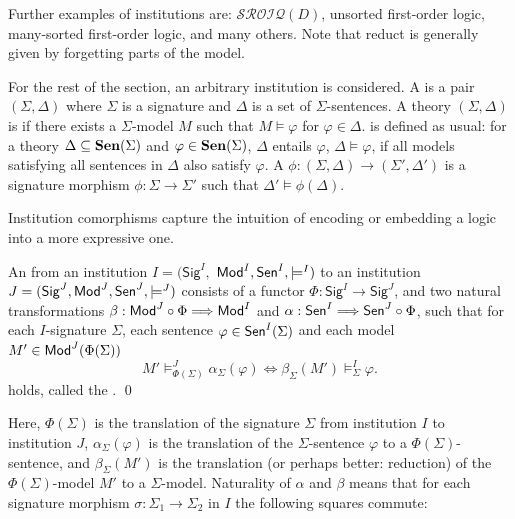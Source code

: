 \documentclass[10pt,fleqn,final]{scrreprt}
\newcommand{\Sig}{\mathsf{Sig}}
\newenvironment{definitions}[0]{\medskip }{}
\begin{document}
\begin{definitions}
Further examples of institutions are: $\mathcal{SROIQ}(D)$, unsorted first-order logic, 
many-sorted first-order logic, and many others.  Note that reduct is generally given by forgetting 
parts of the model.

For the rest of the section, an arbitrary institution is considered. 
A  is a pair $(\Sigma,\Delta)$ where $\Sigma$ is a signature and $\Delta$ is a set of $\Sigma$-sentences.
 A theory $(\Sigma, \Delta)$ is  if there exists a $\Sigma$-model $M$ such that
$M\models\varphi$ for $\varphi \in \Delta$.  is defined as usual: 
for  a theory $\Delta\subseteq \mathbf {Sen}(\Sigma)$ and 
$\varphi\in \mathbf {Sen}(\Sigma)$, $\Delta$ entails $\varphi$, $\Delta\models\varphi$, if all models satisfying all sentences in
$\Delta$ also satisfy $\varphi$. A  $\phi: (\Sigma, \Delta) \rightarrow (\Sigma',  \Delta')$ is 
   a signature morphism $\phi:\Sigma\rightarrow \Sigma'$ such that $\Delta'\models \phi(\Delta)$.

\medskip

Institution comorphisms capture the intuition of encoding or embedding a logic into a more expressive one.

\begin{definition} An  from an institution $I = (\Sig^I,$ $ \mathsf{Mod}^I, \mathsf{Sen}^I, \models^I)$ to an institution $J=(\Sig^J, \Mod^J,\Sen^J, \models^J)$ consists of a functor $\Phi : \Sig^I \longrightarrow \Sig^J$, and
two natural transformations $\beta: \mathsf{Mod}^J \circ \Phi \Longrightarrow \mathsf{Mod}^I$
and $\alpha: \mathsf{Sen}^I \Longrightarrow \mathsf{Sen}^J \circ \Phi$, such that 
for each $I$-signature $\Sigma$, each sentence $\varphi\in\mathsf{Sen}^I(\Sigma)$ and each model $M'\in\mathsf{Mod}^J(\Phi(\Sigma))$
$$ M'\models^{J}_{\Phi(\Sigma)}\alpha_{\Sigma}(\varphi) \Leftrightarrow
\beta_{\Sigma}(M')\models^I_{\Sigma}\varphi.
$$
holds, called the .
\qed\end{definition}

\noindent
Here, $\Phi(\Sigma)$ is the translation of the signature $\Sigma$ from
institution $I$ to institution $J$, $\alpha_{\Sigma}(\varphi)$ is the
translation of the $\Sigma$-sentence $\varphi$ to a
$\Phi(\Sigma)$-sentence, and $\beta_{\Sigma}(M')$ is the translation
(or perhaps better: reduction) of the $\Phi(\Sigma)$-model $M'$ to a
$\Sigma$-model. Naturality of $\alpha$ and $\beta$ means that for each
signature morphism $\sigma:\Sigma_1\rightarrow\Sigma_2$ in $I$ the following 
squares commute:


\end{definitions}
\end{document}
